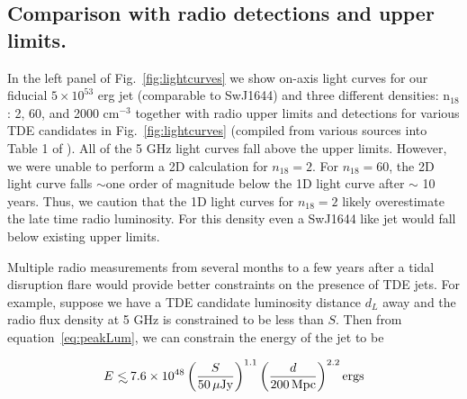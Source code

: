 \documentclass[usenatbib,fleqn]{mnras}
\newcommand\lsim{\mathrel{\rlap{\lower4pt\hbox{\hskip1pt$\sim$}}
    \raise1pt\hbox{$<$}}}
\begin{document}


\subsection{Comparison with radio detections and upper limits.}

In the left panel of Fig.~\ref{fig:lightcurves} we show on-axis light
curves for our fiducial $5\times 10^{53}$ erg jet (comparable to
SwJ1644) and three different densities: n$_{18}$: 2, 60, and 2000
cm$^{-3}$ together with radio upper limits and detections for various
TDE candidates in Fig.~\ref{fig:lightcurves} (compiled from various
sources into Table 1 of \citealt{Mimica+2015}).  All of the 5 GHz
light curves fall above the upper limits. However, we were unable to
perform a 2D calculation for $n_{18}=2$.  For $n_{18}=60$, the 2D
light curve falls $\sim$one order of magnitude below the 1D light
curve after $\sim$ 10 years. Thus, we caution that the 1D light curves
for $n_{18}=2$ likely overestimate the late time radio luminosity. For
this density even a SwJ1644 like jet would fall below existing upper
limits. 

Multiple radio measurements from several months to a few years after a
tidal disruption flare would provide better constraints on the
presence of TDE jets. For example, suppose we have a TDE candidate
luminosity distance $d_L$ away and the radio flux density at 5 GHz is
constrained to be less than $S$. Then from equation~\eqref{eq:peakLum},
we can constrain the energy of the jet to be

\begin{equation}
E\lsim 7.6 \times 10^{48} \left(\frac{S}{50 \,\mu{\rm Jy}}\right)^{1.1}
  \left(\frac{d}{200 \,{\rm Mpc}}\right)^{2.2} {\rm ergs}
\end{equation}
\end{document}
